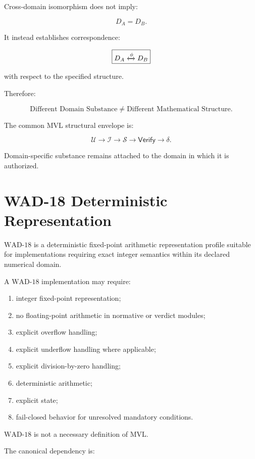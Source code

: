 \documentclass[11pt]{article}
\newcommand{\MVL}{\ensuremath{\mathrm{MVL}}}
\newcommand{\WAD}{\ensuremath{\mathrm{WAD\mbox{-}18}}}
\newcommand{\Purpose}{\mathcal{U}}
\newcommand{\Inv}{\mathcal{I}}
\newcommand{\State}{\mathcal{S}}
\newcommand{\Verify}{\mathsf{Verify}}
\begin{document}
Cross-domain isomorphism does not imply:

\[
D_A=D_B.
\]

It instead establishes correspondence:

\[
\boxed{
D_A
\xleftrightarrow{\phi}
D_B
}
\]

with respect to the specified structure.

Therefore:

\[
\boxed{
\text{Different Domain Substance}
\neq
\text{Different Mathematical Structure}.
}
\]

The common MVL structural envelope is:

\[
\boxed{
\Purpose
\rightarrow
\Inv
\rightarrow
\State
\rightarrow
\Verify
\rightarrow
\delta.
}
\]

Domain-specific substance remains attached to the domain in which
it is authorized.

\section{WAD-18 Deterministic Representation}

\WAD{} is a deterministic fixed-point arithmetic representation
profile suitable for implementations requiring exact integer
semantics within its declared numerical domain.

A \WAD{} implementation may require:

\begin{enumerate}
    \item integer fixed-point representation;
    \item no floating-point arithmetic in normative or verdict
          modules;
    \item explicit overflow handling;
    \item explicit underflow handling where applicable;
    \item explicit division-by-zero handling;
    \item deterministic arithmetic;
    \item explicit state;
    \item fail-closed behavior for unresolved mandatory conditions.
\end{enumerate}

\WAD{} is not a necessary definition of \MVL{}.

The canonical dependency is:
\end{document}
